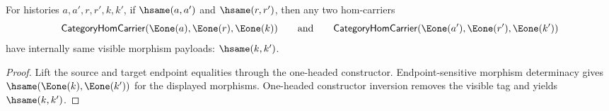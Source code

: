 \begin{theorem}
\label{thm:category-e1-source-e1-target-morphism-payload-deterministic}
For histories $a,a',r,r',k,k'$, if
$\hsame(a,a')$ and $\hsame(r,r')$, then any two hom-carriers
$$
\mathsf{CategoryHomCarrier}(\Eone(a),\Eone(r),\Eone(k))
\qquad\text{and}\qquad
\mathsf{CategoryHomCarrier}(\Eone(a'),\Eone(r'),\Eone(k'))
$$
have internally same visible morphism payloads: $\hsame(k,k')$.
\end{theorem}
\begin{proof}
Lift the source and target endpoint equalities through the one-headed
constructor. Endpoint-sensitive morphism determinacy gives
$\hsame(\Eone(k),\Eone(k'))$ for the displayed morphisms. One-headed
constructor inversion removes the visible tag and yields $\hsame(k,k')$.
\end{proof}
